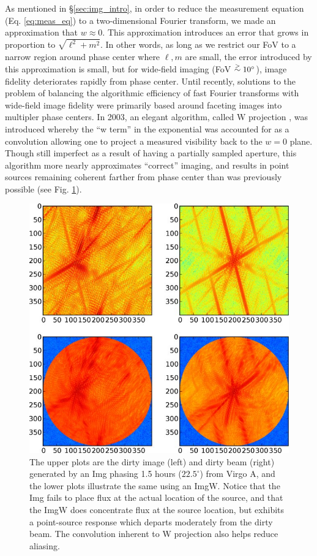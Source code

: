 As mentioned in \S\ref{sec:img_intro}, in order to reduce the measurement
equation (Eq. \ref{eq:meas_eq}) to a two-dimensional Fourier transform, we
made an approximation that $w\approx0$.  This approximation introduces an
error that grows in proportion to $\sqrt{\ell^2+m^2}$.  In other words, as
long as we restrict our FoV to a narrow region around phase center where
$\ell,m$ are small, the error introduced by this approximation is small, but
for wide-field imaging (FoV $\buildrel>\over\sim 10^\circ$), image fidelity
deteriorates rapidly from phase center.  Until recently, solutions to the
problem of balancing the algorithmic efficiency of fast Fourier transforms
with wide-field image fidelity were primarily based around faceting images
into multipler phase centers.  In 2003, an elegant algorithm, called W
projection \cite{cornwell_et_al_2003, cornwell_et-al_2005_347}, was introduced
whereby the ``w term'' in the exponential was accounted for as a convolution
allowing one to project a measured visibility back to the $w=0$ plane.  Though
still imperfect as a result of having a partially sampled aperture, this
algorithm more nearly approximates ``correct'' imaging, and results in
point sources remaining coherent farther from phase center than was previously
possible (see Fig. \ref{fig:img_imgw}).

\begin{figure}
\begin{center}
\includegraphics[scale=.4]{img_imgw.jpg}
\caption{The upper plots are the dirty image (left) and dirty beam (right)
generated by an Img phasing 1.5 hours ($22.5^\circ$) from Virgo A, and the 
lower plots illustrate the same using an ImgW.  Notice that the Img fails
to place flux at the actual location of the source, and that the ImgW does
concentrate flux at the source location, but exhibits a point-source response
which departs moderately from the dirty beam.  The convolution inherent to
W projection also helps reduce aliasing.  }
\label{fig:img_imgw}
\end{center}
\end{figure}

